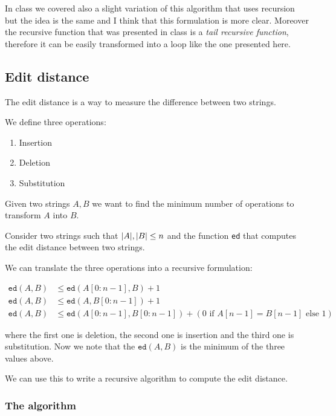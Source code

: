 \documentclass[12pt]{extarticle}
\begin{document}
\begin{remark}
    In class we covered also a slight variation of this algorithm that uses recursion but the idea is the same and I think that this formulation is more clear.
    Moreover the recursive function that was presented in class is a \emph{tail recursive function}, therefore it can be easily transformed into a loop like the one presented here.
\end{remark}

\subsection{Edit distance}

The edit distance is a way to measure the difference between two strings.

We define three operations:
\begin{enumerate}
    \item Insertion
    \item Deletion
    \item Substitution
\end{enumerate}

Given two strings $A, B$ we want to find the minimum number of operations to transform $A$ into $B$.

Consider two strings such that $\abs{A}, \abs{B} \leq n$ and the function \texttt{ed} that computes the edit distance between two strings.

We can translate the three operations into a recursive formulation:

\begin{align*}
    \texttt{ed}(A, B) & \leq \texttt{ed}(A[0:n-1], B) + 1                                                      \\
    \texttt{ed}(A, B) & \leq \texttt{ed}(A, B[0:n-1]) + 1                                                      \\
    \texttt{ed}(A, B) & \leq \texttt{ed}(A[0:n-1], B[0:n-1]) + (0 \text{ if } A[n-1] = B[n-1] \text{ else } 1)
\end{align*}

where the first one is deletion, the second one is insertion and the third one is substitution.
Now we note that the $\texttt{ed}(A, B)$ is the minimum of the three values above.

We can use this to write a recursive algorithm to compute the edit distance.

\subsubsection{The algorithm}
\end{document}
